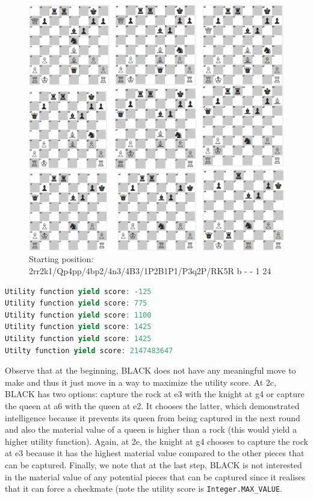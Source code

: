 \documentclass[9.5pt]{extarticle}
\begin{document}
\begin{figure}[H]
\centering
\includegraphics[scale=0.7]{game2.png}
\caption{Starting position: 2rr2k1/Qp4pp/4bp2/4n3/4B3/1P2B1P1/P3q2P/RK5R b - - 1 24}
\label{Figure 2}
\end{figure}

\begin{lstlisting}[language=java,caption={Utility function for game in Figure 2}]
Utility function yield score: -125
Utility function yield score: 775
Utility function yield score: 1100
Utility function yield score: 1425
Utility function yield score: 1425
Utilty function yield score: 2147483647
\end{lstlisting}

Observe that at the beginning, BLACK does not have any meaningful move to make and thus it just move in a way to maximize the utility score. At 2c, BLACK has two options: capture the rock at e3 with the knight at g4 or capture the queen at a6 with the queen at e2. It chooses the latter, which demonstrated intelligence because it prevents its queen from being captured in the next round and also the material value of a queen is higher than a rock (this would yield a higher utility function). Again, at 2e, the knight at g4 chooses to capture the rock at e3 because it has the highest material value compared to the other pieces that can be captured. Finally, we note that at the last step, BLACK is not interested in the material value of any potential pieces that can be captured since it realises that it can force a checkmate (note the utility score is \verb`Integer.MAX_VALUE`.\\
\end{document}
